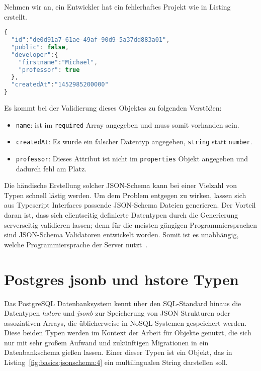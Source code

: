 Nehmen wir an, ein Entwickler hat ein fehlerhaftes Projekt wie in Listing~ erstellt.

\begin{lstlisting}[language=Javascript,float=h!,caption={Ein fehlerhaftes Projekt}, label={fig:basics:jsonschema:3}]
{
  "id":"de0d91a7-61ae-49af-90d9-5a37dd883a01",
  "public": false,
  "developer":{
    "firstname":"Michael",
    "professor": true
  },
  "createdAt":"1452985200000"
}
\end{lstlisting}

Es kommt bei der Validierung dieses Objektes zu folgenden Verstößen:

\begin{itemize}
    \setlength\itemsep{-1em}
    \item \texttt{name}: ist im \texttt{required} Array angegeben und muss somit vorhanden sein.
    \item \texttt{createdAt}: Es wurde ein falscher Datentyp angegeben, \texttt{string} statt \texttt{number}.
    \item \texttt{professor}: Dieses Attribut ist nicht im \texttt{properties} Objekt angegeben und dadurch fehl am Platz.
\end{itemize}

Die händische Erstellung solcher JSON-Schema kann bei einer Vielzahl von Typen schnell lästig werden.
Um dem Problem entgegen zu wirken, lassen sich aus Typescript Interfaces passende JSON-Schema Dateien generieren.
Der Vorteil daran ist, dass sich clientseitig definierte Datentypen durch die Generierung serverseitig validieren lassen;
denn für die meisten gängigen Programmiersprachen sind JSON-Schema Validatoren entwickelt worden.
Somit ist es unabhängig, welche Programmiersprache der Server nutzt~\cite{json-schema-implementations}.

\section{Postgres jsonb und hstore Typen}
\label{sec:basics:postgres}
Das PostgreSQL Datenbanksystem kennt über den SQL-Standard hinaus die Datentypen \emph{hstore} und \emph{jsonb} zur Speicherung von JSON Strukturen oder assoziativen Arrays, die üblicherweise in NoSQL-Systemen gespeichert werden.
Diese beiden Typen werden im Kontext der Arbeit für Objekte genutzt, die sich nur mit sehr großem Aufwand und zukünftigen Migrationen in ein Datenbankschema gießen lassen. Einer dieser Typen ist ein Objekt, das in Listing~\ref{fig:basics:jsonschema:4} ein multilingualen String darstellen soll. 

